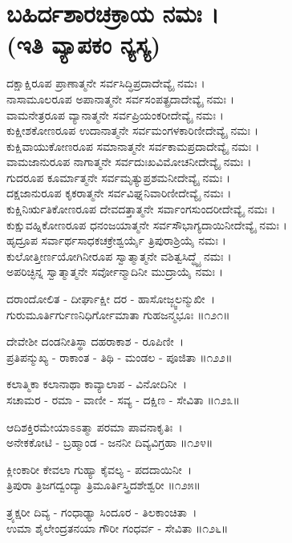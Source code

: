 \section{ಬಹಿರ್ದಶಾರಚಕ್ರಾಯ ನಮಃ ।\\ (ಇತಿ ವ್ಯಾಪಕಂ ನ್ಯಸ್ಯ)}
ದಕ್ಷಾಕ್ಷಿರೂಪ ಪ್ರಾಣಾತ್ಮನೇ ಸರ್ವಸಿದ್ಧಿಪ್ರದಾದೇವ್ಯೈ ನಮಃ ।\\
ನಾಸಾಮೂಲರೂಪ ಅಪಾನಾತ್ಮನೇ ಸರ್ವಸಂಪತ್ಪ್ರದಾದೇವ್ಯೈ ನಮಃ ।\\
ವಾಮನೇತ್ರರೂಪ ವ್ಯಾನಾತ್ಮನೇ ಸರ್ವಪ್ರಿಯಂಕರೀದೇವ್ಯೈ ನಮಃ ।\\
ಕುಕ್ಷೀಶಕೋಣರೂಪ ಉದಾನಾತ್ಮನೇ ಸರ್ವಮಂಗಳಕಾರಿಣೀದೇವ್ಯೈ ನಮಃ ।\\
ಕುಕ್ಷಿವಾಯುಕೋಣರೂಪ ಸಮಾನಾತ್ಮನೇ ಸರ್ವಕಾಮಪ್ರದಾದೇವ್ಯೈ ನಮಃ ।\\
ವಾಮಜಾನುರೂಪ ನಾಗಾತ್ಮನೇ ಸರ್ವದುಃಖವಿಮೋಚನೀದೇವ್ಯೈ ನಮಃ ।\\
ಗುದರೂಪ ಕೂರ್ಮಾತ್ಮನೇ ಸರ್ವಮೃತ್ಯುಪ್ರಶಮನೀದೇವ್ಯೈ ನಮಃ ।\\
ದಕ್ಷಜಾನುರೂಪ ಕೃಕರಾತ್ಮನೇ ಸರ್ವವಿಘ್ನನಿವಾರಿಣೀದೇವ್ಯೈ ನಮಃ ।\\
ಕುಕ್ಷಿನಿರ್ಋತಿಕೋಣರೂಪ ದೇವದತ್ತಾತ್ಮನೇ ಸರ್ವಾಂಗಸುಂದರೀದೇವ್ಯೈ ನಮಃ ।\\
ಕುಕ್ಷುವಹ್ನಿಕೋಣರೂಪ ಧನಂಜಯಾತ್ಮನೇ ಸರ್ವಸೌಭಾಗ್ಯದಾಯಿನೀದೇವ್ಯೈ ನಮಃ ।\\
ಹೃದ್ರೂಪ ಸರ್ವಾರ್ಥಸಾಧಕಚಕ್ರೇಶ್ವರ್ಯೈ ತ್ರಿಪುರಾಶ್ರಿಯೈ ನಮಃ ।\\
ಕುಲೋತ್ತೀರ್ಣಯೋಗಿನೀರೂಪ ಸ್ವಾತ್ಮಾತ್ಮನೇ ವಶಿತ್ವಸಿದ್ಧ್ಯೈ ನಮಃ ।\\
ಅಪರಿಚ್ಛಿನ್ನ ಸ್ವಾತ್ಮಾತ್ಮನೇ ಸರ್ವೋನ್ಮಾದಿನೀ ಮುದ್ರಾಯೈ ನಮಃ ।

ದರಾಂದೋಲಿತ - ದೀರ್ಘಾಕ್ಷೀ ದರ - ಹಾಸೋಜ್ಜ್ವಲನ್ಮುಖೀ~।\\
ಗುರುಮೂರ್ತಿರ್ಗುಣನಿಧಿರ್ಗೋಮಾತಾ ಗುಹಜನ್ಮಭೂಃ ॥೧೨೧॥

ದೇವೇಶೀ ದಂಡನೀತಿಸ್ಥಾ ದಹರಾಕಾಶ - ರೂಪಿಣೀ~।\\
ಪ್ರತಿಪನ್ಮುಖ್ಯ - ರಾಕಾಂತ - ತಿಥಿ - ಮಂಡಲ - ಪೂಜಿತಾ ॥೧೨೨॥

ಕಲಾತ್ಮಿಕಾ ಕಲಾನಾಥಾ ಕಾವ್ಯಾಲಾಪ - ವಿನೋದಿನೀ~।\\
ಸಚಾಮರ - ರಮಾ - ವಾಣೀ - ಸವ್ಯ - ದಕ್ಷಿಣ - ಸೇವಿತಾ ॥೧೨೩॥

ಆದಿಶಕ್ತಿರಮೇಯಾಽಽತ್ಮಾ ಪರಮಾ ಪಾವನಾಕೃತಿಃ~।\\
ಅನೇಕಕೋಟಿ - ಬ್ರಹ್ಮಾಂಡ - ಜನನೀ ದಿವ್ಯವಿಗ್ರಹಾ ॥೧೨೪॥

ಕ್ಲೀಂಕಾರೀ ಕೇವಲಾ ಗುಹ್ಯಾ ಕೈವಲ್ಯ - ಪದದಾಯಿನೀ~।\\
ತ್ರಿಪುರಾ ತ್ರಿಜಗದ್ವಂದ್ಯಾ ತ್ರಿಮೂರ್ತಿಸ್ತ್ರಿದಶೇಶ್ವರೀ ॥೧೨೫॥

ತ್ರ್ಯಕ್ಷರೀ ದಿವ್ಯ - ಗಂಧಾಢ್ಯಾ ಸಿಂದೂರ - ತಿಲಕಾಂಚಿತಾ~।\\
ಉಮಾ ಶೈಲೇಂದ್ರತನಯಾ ಗೌರೀ ಗಂಧರ್ವ - ಸೇವಿತಾ ॥೧೨೬॥

